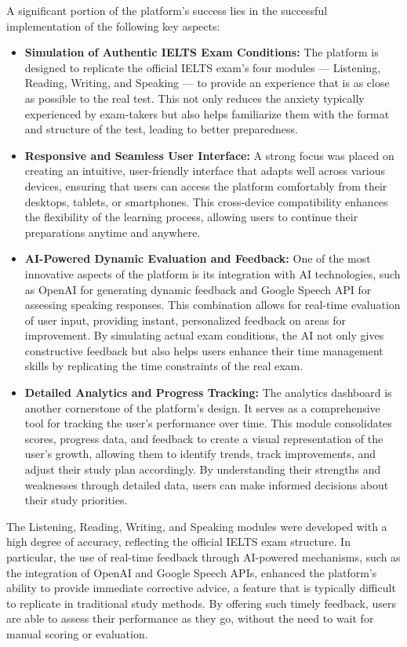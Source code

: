 \documentclass[a4paper,12pt]{article}
\begin{document}
A significant portion of the platform’s success lies in the successful implementation of the following key aspects:
\begin{itemize}
    \item \textbf{Simulation of Authentic IELTS Exam Conditions:} The platform is designed to replicate the official IELTS exam’s four modules — Listening, Reading, Writing, and Speaking — to provide an experience that is as close as possible to the real test. This not only reduces the anxiety typically experienced by exam-takers but also helps familiarize them with the format and structure of the test, leading to better preparedness.
    \item \textbf{Responsive and Seamless User Interface:} A strong focus was placed on creating an intuitive, user-friendly interface that adapts well across various devices, ensuring that users can access the platform comfortably from their desktops, tablets, or smartphones. This cross-device compatibility enhances the flexibility of the learning process, allowing users to continue their preparations anytime and anywhere.
    \item \textbf{AI-Powered Dynamic Evaluation and Feedback:} One of the most innovative aspects of the platform is its integration with AI technologies, such as OpenAI for generating dynamic feedback and Google Speech API for assessing speaking responses. This combination allows for real-time evaluation of user input, providing instant, personalized feedback on areas for improvement. By simulating actual exam conditions, the AI not only gives constructive feedback but also helps users enhance their time management skills by replicating the time constraints of the real exam.
    \item \textbf{Detailed Analytics and Progress Tracking:} The analytics dashboard is another cornerstone of the platform’s design. It serves as a comprehensive tool for tracking the user’s performance over time. This module consolidates scores, progress data, and feedback to create a visual representation of the user’s growth, allowing them to identify trends, track improvements, and adjust their study plan accordingly. By understanding their strengths and weaknesses through detailed data, users can make informed decisions about their study priorities.
\end{itemize}

\vspace{0.3cm}

The Listening, Reading, Writing, and Speaking modules were developed with a high degree of accuracy, reflecting the official IELTS exam structure. In particular, the use of real-time feedback through AI-powered mechanisms, such as the integration of OpenAI and Google Speech APIs, enhanced the platform’s ability to provide immediate corrective advice, a feature that is typically difficult to replicate in traditional study methods. By offering such timely feedback, users are able to assess their performance as they go, without the need to wait for manual scoring or evaluation.
\end{document}
